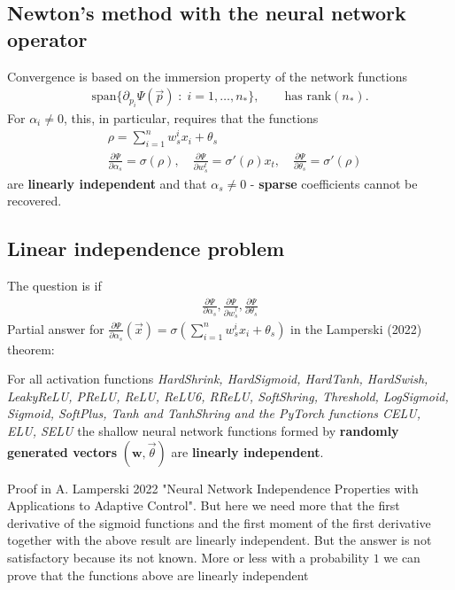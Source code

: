 \subsection{Newton's method with the neural network operator}
Convergence is based on the immersion property of the network functions
\begin{align}
    \text{span}\{\partial_{p_i}\Psi(\vec{p})\;:\;i=1,\ldots,n_*\}, \qquad
    \text{has rank}(n_*).
\end{align}
For $\alpha_i \neq 0$, this, in particular, requires that the functions
\begin{align}
    &\rho = \sum_{i=1}^{n}w_s^{i}x_i + \theta_s \\
    & \frac{\partial \Psi}{\partial \alpha_s} =\sigma(\rho),\quad
     \frac{\partial \Psi}{\partial w_s^{t}} =\sigma'(\rho)x_t,\quad
     \frac{\partial \Psi}{\partial \theta_s} =\sigma'(\rho)
\end{align}
are \textbf{linearly independent} and that $\alpha_s \neq 0$ -
\textbf{sparse} coefficients cannot be recovered.
\subsection{Linear independence problem}
The question is if
\begin{align}
    \frac{\partial \Psi}{\partial \alpha_s} ,
    \frac{\partial \Psi}{\partial w_s^{\dagger}} ,
    \frac{\partial \Psi}{\partial \theta_s}
\end{align}
Partial answer for $\frac{\partial \Psi}{\partial \alpha_s} (\vec{x}) =
\sigma\left( \sum_{i=1}^{n} w_s^{i}x_i + \theta_s \right)$ in the
Lamperski (2022) theorem:
\begin{theorem}
    For all activation functions \textit{HardShrink, HardSigmoid, HardTanh,
    HardSwish, LeakyReLU, PReLU, ReLU, ReLU6, RReLU, SoftShring, Threshold,
    LogSigmoid, Sigmoid, SoftPlus, Tanh and TanhShring and the PyTorch
    functions CELU, ELU, SELU} the shallow neural network functions formed by
    \textbf{randomly generated vectors} $(\mathbf{w}, \vec{\theta})$ are
    \textbf{linearly independent}.
\end{theorem}
Proof in A. Lamperski 2022 "Neural Network Independence Properties with
Applications to Adaptive Control". But here we need more that the first
derivative of the sigmoid functions and the first moment of the first
derivative together with the above result are linearly independent.
But the answer is not satisfactory because its not known. More or less with a
probability $1$ we can prove that the functions above are linearly
independent

